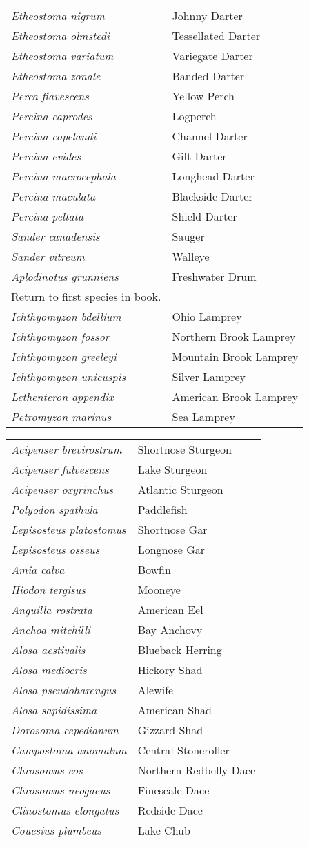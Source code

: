 \documentclass[11pt]{article}
\begin{document}
\vspace{\baselineskip}

%
\textbf{\Student}

\begin{tabular}{@{}L{3in}L{3in}@{}}
\textit{Etheostoma nigrum} & Johnny Darter\tabularnewline
\textit{Etheostoma olmstedi} & Tessellated Darter\tabularnewline
\textit{Etheostoma variatum} & Variegate Darter\tabularnewline
\textit{Etheostoma zonale} & Banded Darter\tabularnewline
\textit{Perca flavescens} & Yellow Perch\tabularnewline
\textit{Percina caprodes} & Logperch\tabularnewline
\textit{Percina copelandi} & Channel Darter\tabularnewline
\textit{Percina evides} & Gilt Darter\tabularnewline
\textit{Percina macrocephala} & Longhead Darter\tabularnewline
\textit{Percina maculata} & Blackside Darter\tabularnewline
\textit{Percina peltata} & Shield Darter\tabularnewline
\textit{Sander canadensis} & Sauger\tabularnewline
\textit{Sander vitreum} & Walleye\tabularnewline
\textit{Aplodinotus grunniens} & Freshwater Drum\tabularnewline
\qquad Return to first species in book. & \tabularnewline
\textit{Ichthyomyzon bdellium} & Ohio Lamprey\tabularnewline
\textit{Ichthyomyzon fossor} & Northern Brook Lamprey\tabularnewline
\textit{Ichthyomyzon greeleyi} & Mountain Brook Lamprey\tabularnewline
\textit{Ichthyomyzon unicuspis} & Silver Lamprey\tabularnewline
\textit{Lethenteron appendix} & American Brook Lamprey\tabularnewline
\textit{Petromyzon marinus} & Sea Lamprey\tabularnewline
\end{tabular}

\newpage

\vspace{\baselineskip}

%
\textbf{\Student}

\begin{tabular}{@{}L{3in}L{3in}@{}}
\textit{Acipenser brevirostrum} & Shortnose Sturgeon\tabularnewline
\textit{Acipenser fulvescens} & Lake Sturgeon\tabularnewline
\textit{Acipenser oxyrinchus} & Atlantic Sturgeon\tabularnewline
\textit{Polyodon spathula} & Paddlefish\tabularnewline
\textit{Lepisosteus platostomus} & Shortnose Gar\tabularnewline
\textit{Lepisosteus osseus} & Longnose Gar\tabularnewline
\textit{Amia calva} & Bowfin\tabularnewline
\textit{Hiodon tergisus} & Mooneye\tabularnewline
\textit{Anguilla rostrata} & American Eel\tabularnewline
\textit{Anchoa mitchilli} & Bay Anchovy\tabularnewline
\textit{Alosa aestivalis} & Blueback Herring\tabularnewline
\textit{Alosa mediocris} & Hickory Shad\tabularnewline
\textit{Alosa pseudoharengus} & Alewife\tabularnewline
\textit{Alosa sapidissima} & American Shad\tabularnewline
\textit{Dorosoma cepedianum} & Gizzard Shad\tabularnewline
\textit{Campostoma anomalum} & Central Stoneroller\tabularnewline
\textit{Chrosomus eos} & Northern Redbelly Dace\tabularnewline
\textit{Chrosomus neogaeus} & Finescale Dace\tabularnewline
\textit{Clinostomus elongatus} & Redside Dace\tabularnewline
\textit{Couesius plumbeus} & Lake Chub\tabularnewline
\end{tabular}
\end{document}
